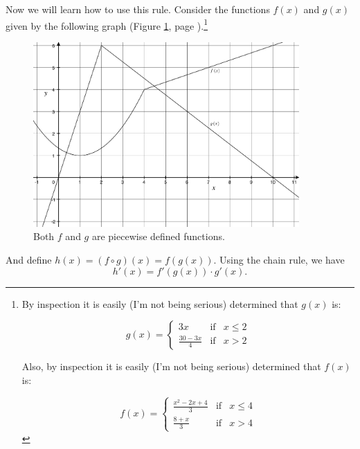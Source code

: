 \documentclass[12pt,addpoints, answers, fleqn]{exam}
\begin{document}
Now we will learn how to use this rule. Consider the functions $f\left( x \right)$ and $g\left( x \right)$ given by the following graph (Figure \ref{fig:graph1501}, page \pageref{fig:graph1501}).\footnote{By inspection it is easily (I'm not being serious) determined that $g\left( x \right)$ is:

\[
g\left( x \right) =
\left\{
{\begin{array}{ccr}
  {3x} & {\mbox{if}} & {x \leq 2} \\[10pt]
  {\displaystyle \frac{30-3x}{4}} & {\mbox{if}} & {x > 2} 
\end{array}}
\right.
\]

Also, by inspection it is easily (I'm not being serious) determined that $f\left( x \right)$ is:


\[
f\left( x \right) =
\left\{
{\begin{array}{ccr}
  {\displaystyle \frac{x^2-2x+4}{3}} & {\mbox{if}} & {x \leq 4} \\[10pt]
  {\displaystyle \frac{8+x}{3}} & {\mbox{if}} & {x > 4} 
\end{array}}
\right.
\]}
\begin{figure}[htbp] %
   \centering
   \includegraphics[width=4in]{./graphics/graph1501.pdf} 
   \caption{Both $f$ and $g$ are piecewise defined functions.}
   \label{fig:graph1501}
\end{figure}

And define $h\left( x \right) = \left( f  \circ g \right) \left( x \right) = f \left( g \left( x \right) \right)$. Using the chain rule, we have
\[
h'\left( x \right) = f' \left( g \left( x \right) \right) \cdot g' \left( x \right).
\]
\end{document}

